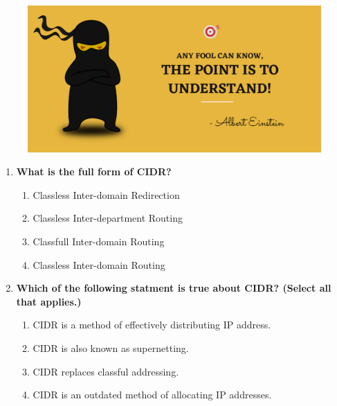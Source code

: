 \setlength{\columnsep}{3pt}
\begin{flushleft}
	
	\paragraph{}
	\bigskip
	
	\begin{figure}[h!]
		\centering
		\includegraphics[scale=.2]{content/practise.jpg}
	\end{figure}	
	\begin{enumerate}
		
		\item \textbf{What is the full form of CIDR?}
		\begin{enumerate}[label=(\alph*)]
			\item Classless Inter-domain Redirection 
			\item Classless Inter-department Routing
			\item Classfull Inter-domain Routing
			\item Classless Inter-domain Routing  %
		\end{enumerate}
		\bigskip
		\bigskip
		
		\item \textbf{Which of the following statment is true about CIDR? (Select all that applies.)}
		\begin{enumerate}[label=(\alph*)]
			\item CIDR is a method of effectively distributing IP address.  %
			\item CIDR is also known as supernetting.  %
			\item CIDR replaces classful addressing.  %
			\item CIDR is an outdated method of allocating IP addresses.
		\end{enumerate}
				
	\end{enumerate}
\end{flushleft}

\newpage

